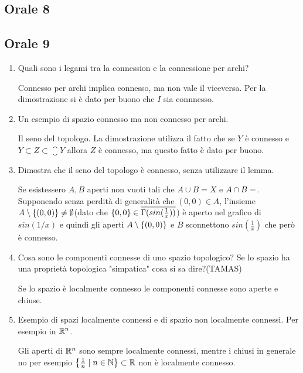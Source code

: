 \documentclass[]{article}
\begin{document}
\subsection{Orale 8}

\subsection{Orale 9}
\begin{enumerate}
    \item Quali sono i legami tra la connession e la connessione per archi?
    \begin{answer}
        Connesso per archi implica connesso, ma non vale il viceversa.
        Per la dimostrazione si \`e dato per buono che $I$ sia connnesso.
    \end{answer}
    \item Un esempio di spazio connesso ma non connesso per archi.
    \begin{answer}
        Il seno del topologo. La dimostrazione utilizza il fatto che se $Y$ \`e connesso
        e $Y \subset Z \subset \closure{Y}$ allora $Z$ \`e connesso, ma questo fatto \`e dato per buono.
    \end{answer}
    \item Dimostra che il seno del topologo \`e connesso, senza utilizzare il lemma.
    \begin{answer}
        Se esistessero $A,B$ aperti non vuoti tali che $A \cup B = X$ e $A \cap B = \empty$. Supponendo senza perdit\`a
        di generalit\`a che $(0,0) \in A$, l'insieme $A \setminus \left\{ (0,0) \right\} \neq \emptyset$(dato che $\left\{ 0,0 \right\} \in \overline{\Gamma(sin(\frac{1}{x}))} $) \`e aperto nel grafico di $sin\left(1/x\right)$
        e quindi gli aperti $A \setminus \left\{ (0,0) \right\}$ e $B$ sconnettono $sin\left(\frac{1}{x}\right)$ che per\`o \`e connesso.
    \end{answer} 
    \item Cosa sono le componenti connesse di uno spazio topologico? Se lo spazio ha una propriet\`a topologica "simpatica" cosa si sa dire?(TAMAS)
    \begin{answer}
        Se lo spazio \`e localmente connesso le componenti connesse sono aperte e chiuse.
    \end{answer}
    \item Esempio di spazi localmente connessi e di spazio non localmente connessi. Per esempio in $\mathbb{R}^n$.
    \begin{answer}
        Gli aperti di $\mathbb{R}^n$ sono sempre localmente connessi, mentre i chiusi in generale no per esempio $\left\{ \frac{1}{n} \mid n \in \mathbb{N} \right\} \subset \mathbb{R}$ non \`e localmente connesso.
    \end{answer}
\end{enumerate}

    
\end{document}
